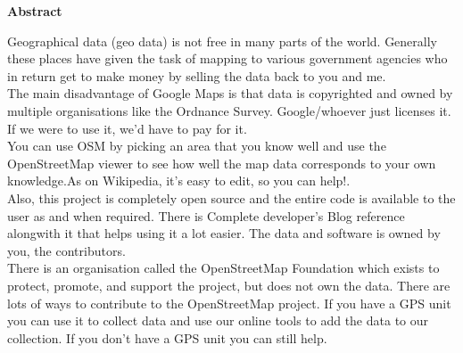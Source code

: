 \begin{center}
{\Huge \bf{Abstract}\vskip 0.2in}
\end{center}

Geographical data (geo data) is not free in many parts of the world. Generally these places have given the task of mapping to various government agencies who in return get to make money by selling the data back to you and me.\\

The main disadvantage of Google Maps is that data is copyrighted and owned by multiple organisations like the Ordnance Survey. Google/whoever just licenses it. If we were to use it, we'd have to pay for it.\\

You can use OSM by picking an area that you know well and use the OpenStreetMap viewer to see how well the map data corresponds to your own knowledge.As on Wikipedia, it's easy to edit, so you can help!.\\


Also, this project is completely open source and the entire code is available
to the user as and when required. There is Complete developer's
Blog reference  alongwith it that helps using it a lot easier. The data and software is owned by you, the contributors.\\

There is an organisation called the OpenStreetMap Foundation which exists to protect, promote, and support the project, but does not own the data. 
There are lots of ways to contribute to the OpenStreetMap project. If you have a GPS unit you can use it to collect data and use our online tools to add the data to our collection. If you don't have a GPS unit you can still help.\\ 
